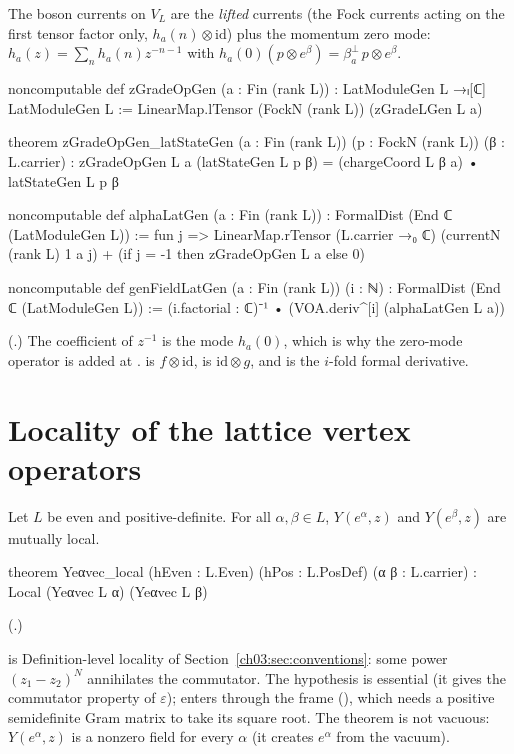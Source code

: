 The boson currents on $V_L$ are the \emph{lifted} currents (the Fock currents acting on the first
tensor factor only, $h_a(n)\otimes\mathrm{id}$) plus the momentum zero mode:
$h_a(z)=\sum_nh_a(n)z^{-n-1}$ with $h_a(0)(p\otimes e^\beta)=\beta^\perp_a\,p\otimes e^\beta$.
\begin{leancode}
noncomputable def zGradeOpGen (a : Fin (rank L)) : LatModuleGen L →ₗ[ℂ] LatModuleGen L :=
  LinearMap.lTensor (FockN (rank L)) (zGradeLGen L a)

theorem zGradeOpGen_latStateGen (a : Fin (rank L)) (p : FockN (rank L)) (β : L.carrier) :
    zGradeOpGen L a (latStateGen L p β)
      = (chargeCoord L β a) • latStateGen L p β

noncomputable def alphaLatGen (a : Fin (rank L)) : FormalDist (End ℂ (LatModuleGen L)) :=
  fun j => LinearMap.rTensor (L.carrier →₀ ℂ) (currentN (rank L) 1 a j)
    + (if j = -1 then zGradeOpGen L a else 0)

noncomputable def genFieldLatGen (a : Fin (rank L)) (i : ℕ) : FormalDist (End ℂ (LatModuleGen L)) :=
  (i.factorial : ℂ)⁻¹ • (VOA.deriv^[i] (alphaLatGen L a))
\end{leancode}
(.) The coefficient of $z^{-1}$ is the mode
$h_a(0)$, which is why the zero-mode operator is added at .  is
$f\otimes\mathrm{id}$,  is $\mathrm{id}\otimes g$, and  is the
$i$-fold formal derivative.

\section{Locality of the lattice vertex operators}\label{ch03:sec:locality}

\begin{theorem}\label{ch03:thm:Yelocal}
Let $L$ be even and positive-definite. For all $\alpha,\beta\in L$, $Y(e^\alpha,z)$ and
$Y(e^\beta,z)$ are mutually local.
\end{theorem}
\begin{leancode}
theorem Yeαvec_local (hEven : L.Even) (hPos : L.PosDef) (α β : L.carrier) :
    Local (Yeαvec L α) (Yeαvec L β)
\end{leancode}
(.)

\begin{dictionary}
 is Definition-level locality of Section~\ref{ch03:sec:conventions}: some power
$(z_1-z_2)^N$ annihilates the commutator. The hypothesis  is essential (it gives the
commutator property of $\varepsilon$);  enters through the frame
(), which needs a positive semidefinite Gram matrix to take its square
root. The theorem is not vacuous: $Y(e^\alpha,z)$ is a nonzero field for every $\alpha$ (it creates
$e^\alpha$ from the vacuum).
\end{dictionary}


